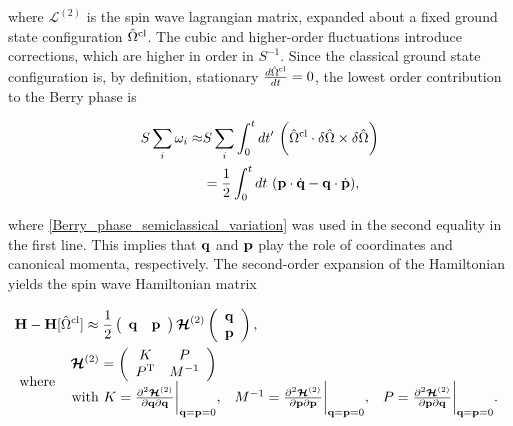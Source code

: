 where $ \bm{\mathcal{L}}^{(2)}$ is the spin wave lagrangian matrix, expanded about a fixed ground state configuration $\hat{\Omega}^{\textnormal{cl}}$. The cubic and higher-order fluctuations introduce corrections, which are higher in order in $S^{-1}$. Since the classical ground state configuration is, by definition, stationary $\frac{d \hat{\Omega}^{\textnormal{cl}}}{dt} = 0$, the lowest order contribution to the Berry phase is 

\begin{equation}
\begin{split}
    S \sum_{i}\omega_i \approx& S \sum_{i} \int_{0}^{t} dt' \textnormal{ } \bigg(\hat{\Omega}^{\textnormal{cl}} \cdot \delta\hat{\Omega} \times \delta \hat{\Omega} \bigg) \\
    &= \frac{1}{2} \int_{0}^{t} dt \textnormal{ } ({\bf p} \cdot \dot{{\bf q}} - {\bf q} \cdot \dot{{\bf p}}),
\end{split}
\end{equation}

where \cref{Berry_phase_semiclassical_variation} was used in the second equality in the first line. This implies that ${\bf q}$ and ${\bf p}$ play the role of coordinates and canonical momenta, respectively. The second-order expansion of the Hamiltonian yields the spin wave Hamiltonian matrix 

\begin{equation}
    \begin{split}
        &{\bf H} - {\bf H}[\hat{\Omega}^{\textnormal{cl}}] \approx \frac{1}{2} \left(\begin{array}{cc}
          {\bf q} & {\bf p}
    \end{array}\right) \bm{\mathcal{H}}^{(2)} \left( \begin{array}{c}
          {\bf q} \\
          {\bf p}
    \end{array}\right), \\
    &\textnormal{ where } \begin{array}{ccc}
         \bm{\mathcal{H}}^{(2)} = \left(\begin{array}{cc}
         K & P  \\
         P^{\textnormal{T}} & M^{-1} 
    \end{array}\right) \\
         \textnormal{ with } K = \frac{\partial^2 \bm{\mathcal{H}}^{(2)}}{\partial {\bf q} \partial {\bf q}}\bigg|_{{\bf q} = {\bf p} = 0}, & 
         M^{-1} = \frac{\partial^2 \bm{\mathcal{H}}^{(2)}}{\partial {\bf p} \partial {\bf p}}\bigg|_{{\bf q} = {\bf p} = 0}, & 
         P = \frac{\partial^2 \bm{\mathcal{H}}^{(2)}}{\partial {\bf p} \partial {\bf q}}\bigg|_{{\bf q} = {\bf p} = 0}.
    \end{array}
    \end{split}
    \label{spin_wave_path_integral_quadratic_form_matrix_form}
\end{equation}

